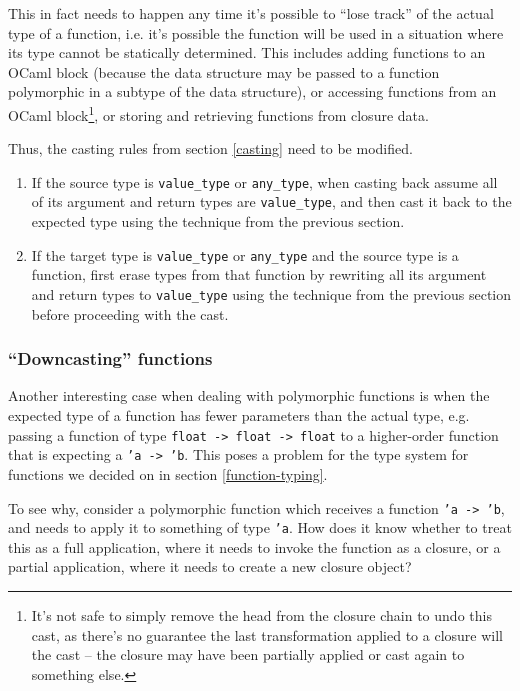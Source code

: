 \documentclass[12pt,a4paper,twoside,openright]{report}
\begin{document}
This in fact needs to happen any time it's possible to ``lose track'' of the 
actual type of a function, i.e. it's possible the function will be used in a 
situation where its type cannot be statically determined. This includes adding 
functions to an OCaml block (because the data structure may be passed to a 
function polymorphic in a subtype of the data structure), or accessing 
functions from an OCaml block\footnote{It's not safe to simply remove the head 
from the closure chain to undo this cast, as there's no guarantee the last 
transformation applied to a closure will the cast -- the closure may have been 
partially applied or cast again to something else.}, or storing and retrieving 
functions from closure data.

Thus, the casting rules from section \ref{casting} need to be modified.

\begin{enumerate}
    \item If the source type is \verb|value_type| or \verb|any_type|, when 
    casting back assume all of its argument and return types are 
    \verb|value_type|, and then cast it back to the expected type using the 
    technique from the previous section.
    \item If the target type is \verb|value_type| or \verb|any_type| and the 
    source type is a function, first erase types from that function by 
    rewriting all its argument and return types to \verb|value_type| using the 
    technique from the previous section before proceeding with the cast.
\end{enumerate}

\subsubsection{``Downcasting'' functions}

Another interesting case when dealing with polymorphic functions is when the 
expected type of a function has fewer parameters than the actual type, e.g. 
passing a function of type \texttt{float -> float -> float} to a higher-order 
function that is expecting a \texttt{'a -> 'b}. This poses a problem for the 
type system for functions we decided on in section \ref{function-typing}.

To see why, consider a polymorphic function which receives a function 
\texttt{'a -> 'b}, and needs to apply it to something of type \texttt{'a}. How 
does it know whether to treat this as a full application, where it needs to 
invoke the function as a closure, or a partial application, where it needs to 
create a new closure object?
\end{document}
